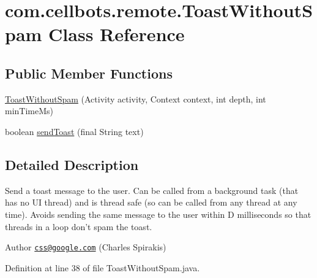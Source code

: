 \hypertarget{classcom_1_1cellbots_1_1remote_1_1_toast_without_spam}{\section{com.\-cellbots.\-remote.\-Toast\-Without\-Spam Class Reference}
\label{classcom_1_1cellbots_1_1remote_1_1_toast_without_spam}
}
\subsection*{Public Member Functions}
\begin{DoxyCompactItemize}
\item 
\hyperlink{classcom_1_1cellbots_1_1remote_1_1_toast_without_spam_add10c0f2b5c38334f4d6a40a16cc7f9d}{Toast\-Without\-Spam} (Activity activity, Context context, int depth, int min\-Time\-Ms)
\item 
boolean \hyperlink{classcom_1_1cellbots_1_1remote_1_1_toast_without_spam_abb4093c0b8243ab6ab03997169ec2da6}{send\-Toast} (final String text)
\end{DoxyCompactItemize}


\subsection{Detailed Description}
Send a toast message to the user. Can be called from a background task (that has no U\-I thread) and is thread safe (so can be called from any thread at any time). Avoids sending the same message to the user within D milliseconds so that threads in a loop don't spam the toast.

\begin{DoxyAuthor}{Author}
\href{mailto:css@google.com}{\tt css@google.\-com} (Charles Spirakis) 
\end{DoxyAuthor}


Definition at line 38 of file Toast\-Without\-Spam.\-java.



